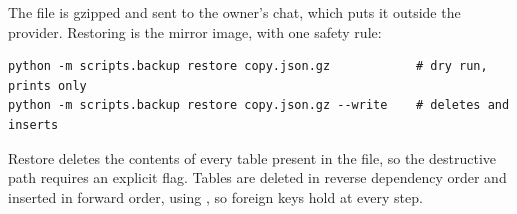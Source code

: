 The file is gzipped and sent to the owner's chat, which puts it outside the
provider. Restoring is the mirror image, with one safety rule:

\begin{lstlisting}[style=sh]
python -m scripts.backup restore copy.json.gz            # dry run, prints only
python -m scripts.backup restore copy.json.gz --write    # deletes and inserts
\end{lstlisting}

Restore deletes the contents of every table present in the file, so the
destructive path requires an explicit flag. Tables are deleted in reverse
dependency order and inserted in forward order, using
, so foreign keys hold at every step.
